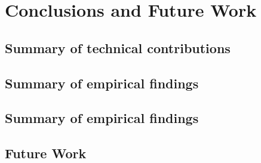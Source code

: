 
\chapter{Conclusions and Future Work}
\label{results}


\section{Summary of technical contributions}

\section{Summary of empirical findings}


\section{Summary of empirical findings}

\section{Future Work}